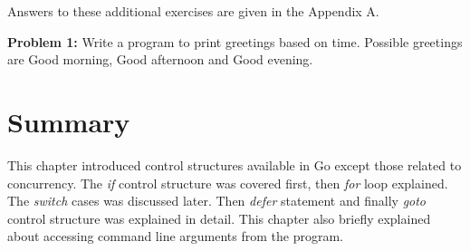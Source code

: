 Answers to these additional exercises are given in the Appendix A.

\textbf{Problem 1:} Write a program to print greetings based on time.
Possible greetings are Good morning, Good afternoon and Good evening.

\section*{Summary}

This chapter introduced control structures available in Go except
those related to concurrency.  The \textit{if} control structure was
covered first, then \textit{for} loop explained.  The \textit{switch}
cases was discussed later.  Then \textit{defer} statement and
finally \textit{goto} control structure was explained in detail.  This
chapter also briefly explained about accessing command line arguments
from the program.
